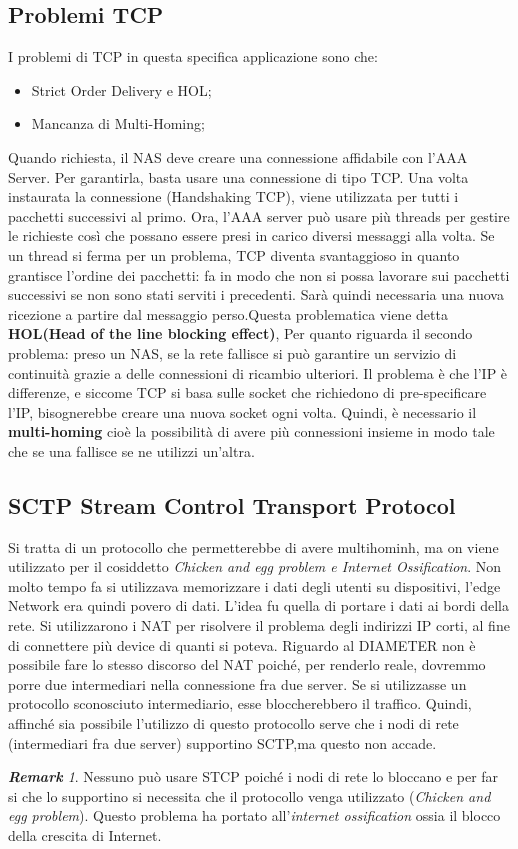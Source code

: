 \documentclass{article}
\theoremstyle{remark}
\newtheorem*{remark}{\textbf{Remark}}
\begin{document}
\subsection{Problemi TCP}
I problemi di TCP in questa specifica applicazione sono che:\begin{itemize}
    \item Strict Order Delivery e HOL;
    \item Mancanza di Multi-Homing;
\end{itemize} 
Quando richiesta, il NAS deve creare una connessione affidabile con l'AAA Server. Per garantirla, basta usare una connessione di tipo TCP. Una volta instaurata la connessione (Handshaking TCP), viene utilizzata per tutti i pacchetti successivi al primo. Ora, l'AAA server può usare più threads per gestire le richieste così che possano essere presi in carico diversi messaggi alla volta. Se un thread si ferma per un problema, TCP diventa svantaggioso in quanto grantisce l'ordine dei pacchetti: fa in modo che non si possa lavorare sui pacchetti successivi se non sono stati serviti i precedenti. Sarà quindi necessaria una nuova ricezione a partire dal messaggio perso.\newline Questa problematica viene detta \textbf{HOL(Head of the line blocking effect)},\newline
Per quanto riguarda il secondo problema: preso un NAS, se la rete fallisce si può garantire un servizio di continuità grazie a delle connessioni di ricambio ulteriori. Il problema è che l'IP è differenze, e siccome TCP si basa sulle socket che richiedono di pre-specificare l'IP, bisognerebbe creare una nuova socket ogni volta. Quindi, è necessario il \textbf{multi-homing} cioè la possibilità di avere più connessioni insieme in modo tale che se una fallisce se ne utilizzi un'altra.
\subsection{SCTP Stream Control Transport Protocol}
Si tratta di un protocollo che permetterebbe di avere multihominh, ma on viene utilizzato per il cosiddetto \emph{Chicken and egg problem e Internet Ossification}.\newline
Non molto tempo fa si utilizzava memorizzare i dati degli utenti su dispositivi, l'edge Network era quindi povero di dati. L'idea fu quella di portare i dati ai bordi della rete. Si utilizzarono i NAT per risolvere il problema degli indirizzi IP corti, al fine di connettere più device di quanti si poteva. Riguardo al DIAMETER non è possibile fare lo stesso discorso del NAT poiché, per renderlo reale, dovremmo porre due intermediari nella connessione fra due server. Se si utilizzasse un protocollo sconosciuto intermediario, esse bloccherebbero il traffico. Quindi, affinché sia possibile l'utilizzo di questo protocollo serve che i nodi di rete (intermediari fra due server) supportino SCTP,ma questo non accade.\begin{remark}
Nessuno può usare STCP poiché i nodi di rete lo bloccano e per far si che lo supportino si necessita che il protocollo venga utilizzato (\emph{Chicken and egg problem}). Questo problema ha portato all'\emph{internet ossification} ossia il blocco della crescita di Internet.
\end{remark}
\end{document}

